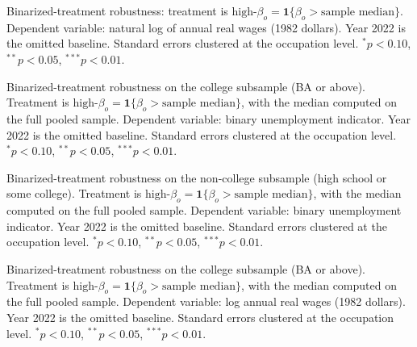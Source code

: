 \documentclass[11pt]{article}
\theoremstyle{plain}
\theoremstyle{remark}
\begin{document}
\begin{table}[H]
\begin{center}
\caption{Binarized-treatment robustness: treatment is $\text{high-}\beta_o = \mathbf{1}\{\beta_o > \text{sample median}\}$. Dependent variable: natural log of annual real wages (1982 dollars). Year 2022 is the omitted baseline. Standard errors clustered at the occupation level. $^{*}p<0.10$, $^{**}p<0.05$, $^{***}p<0.01$.}
\label{tab:logwage_main_bin}
\resizebox{0.9\textwidth}{!}{}
\end{center}
\end{table}

\begin{table}[H]
\begin{center}
\caption{Binarized-treatment robustness on the college subsample (BA or above). Treatment is $\text{high-}\beta_o = \mathbf{1}\{\beta_o > \text{sample median}\}$, with the median computed on the full pooled sample. Dependent variable: binary unemployment indicator. Year 2022 is the omitted baseline. Standard errors clustered at the occupation level. $^{*}p<0.10$, $^{**}p<0.05$, $^{***}p<0.01$.}
\label{tab:unemp_col_bin}
\resizebox{0.9\textwidth}{!}{}
\end{center}
\end{table}

\begin{table}[H]
\begin{center}
\caption{Binarized-treatment robustness on the non-college subsample (high school or some college). Treatment is $\text{high-}\beta_o = \mathbf{1}\{\beta_o > \text{sample median}\}$, with the median computed on the full pooled sample. Dependent variable: binary unemployment indicator. Year 2022 is the omitted baseline. Standard errors clustered at the occupation level. $^{*}p<0.10$, $^{**}p<0.05$, $^{***}p<0.01$.}
\label{tab:unemp_noncol_bin}
\resizebox{0.9\textwidth}{!}{}
\end{center}
\end{table}

\begin{table}[H]
\begin{center}
\caption{Binarized-treatment robustness on the college subsample (BA or above). Treatment is $\text{high-}\beta_o = \mathbf{1}\{\beta_o > \text{sample median}\}$, with the median computed on the full pooled sample. Dependent variable: log annual real wages (1982 dollars). Year 2022 is the omitted baseline. Standard errors clustered at the occupation level. $^{*}p<0.10$, $^{**}p<0.05$, $^{***}p<0.01$.}
\label{tab:lw_col_bin}
\resizebox{0.9\textwidth}{!}{}
\end{center}
\end{table}
\end{document}

